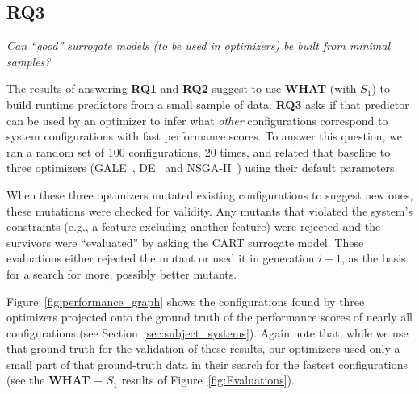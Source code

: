 \documentclass{newsig}
\newcommand{\fig}[1]{Figure~\ref{fig:#1}}
\newcommand{\what}{{\bf WHAT }}
\begin{document}
\subsection{RQ3}

\begin{center}
{\em
Can ``good'' surrogate models (to be used in optimizers)
be built from minimal samples?}
\end{center}

The results of answering {\bf RQ1} and {\bf RQ2} suggest to use \what (with $S_1$) to build runtime predictors from a small sample of  data. {\bf RQ3}
asks if that predictor can be used by an optimizer to infer what {\em other} configurations correspond to system configurations with fast performance scores.
To answer this question,  we ran  a random set of 100 
configurations, 20 times, and related that baseline to three optimizers (GALE~\cite{krall2014gale}, DE~\cite{storn1997differential} and  NSGA-II~\cite{deb00afast}) using their
default parameters.
 
When these three optimizers mutated existing configurations to suggest new ones,
these mutations were checked for validity. Any mutants that violated the system's constraints (e.g., a feature excluding another feature) were rejected
and the survivors were ``evaluated'' by asking the CART surrogate model.
These evaluations either rejected the mutant or used it in generation $i+1$, as the basis for a search for more, possibly
better  mutants.




\fig{performance_graph} shows the configurations found by three optimizers projected onto the ground truth of the performance scores of nearly
all configurations (see Section~\ref{sec:subject_systems}). Again note that, while we use that ground truth for the validation of these results, our optimizers 
used only a small part of that ground-truth data in their search for the fastest configurations (see the \what + $S_1$
results of \fig{Evaluations}).
\end{document}
